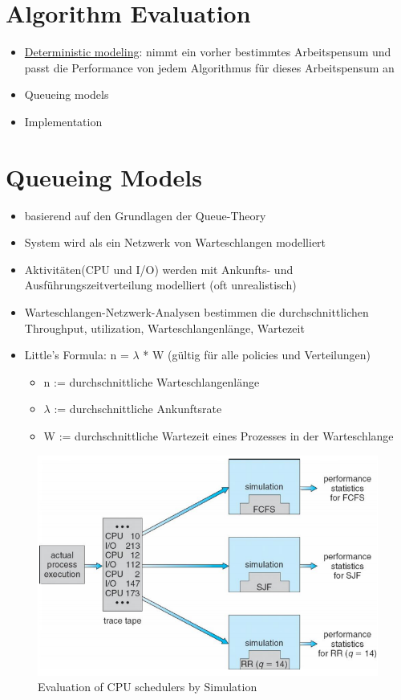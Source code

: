 \documentclass[a4paper]{scrreprt}
\begin{document}
\section{Algorithm Evaluation}
\begin{itemize}
\item \underline{Deterministic modeling}: nimmt ein vorher bestimmtes Arbeitspensum und passt die Performance von jedem Algorithmus für dieses Arbeitspensum an
\item Queueing models
\item Implementation
\end{itemize}
\section{Queueing Models}
\begin{itemize}
\item basierend auf den Grundlagen der Queue-Theory
\item System wird als ein Netzwerk von Warteschlangen modelliert
\item Aktivitäten(CPU und I/O) werden mit Ankunfts- und Ausführungszeitverteilung modelliert (oft unrealistisch)
\item Warteschlangen-Netzwerk-Analysen bestimmen die durchschnittlichen Throughput, utilization, Warteschlangenlänge, Wartezeit
\item Little's Formula: n = $\lambda$ * W (gültig für alle policies und Verteilungen)
\begin{itemize}
\item n := durchschnittliche Warteschlangenlänge
\item $\lambda$ := durchschnittliche Ankunftsrate
\item W := durchschnittliche Wartezeit eines Prozesses in der Warteschlange
\end{itemize}
\end{itemize}
\begin{figure}[htb]
\includegraphics[scale = 0.5]{graphics/evaluation.png}
\caption{Evaluation of CPU schedulers by Simulation}
\end{figure}
\end{document}
